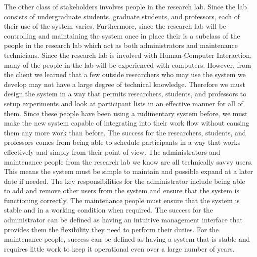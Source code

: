 The other class of stakeholders involves people in the research lab. Since the lab consists of undergraduate students, graduate students, and professors, each of their use of the system varies. Furthermore, since the research lab will be controlling and maintaining the system once in place their is a subclass of the people in the research lab which act as both administrators and maintenance technicians. Since the research lab is involved with Human-Computer Interaction, many of the people in the lab will be experienced with computers. However, from the client we learned that a few outside researchers who may use the system we develop may not have a large degree of technical knowledge. Therefore we must design the system in a way that permits researchers, students, and professors to setup experiments and look at participant lists in an effective manner for all of them. Since these people have been using a rudimentary system before, we must make the new system capable of integrating into their work flow without causing them any more work than before. The success for the researchers, students, and professors comes from being able to schedule participants in a way that works effectively and simply from their point of view. The administrators and maintenance people from the research lab we know are all technically savvy users. This means the system must be simple to maintain and possible expand at a later date if needed. The key responsibilities for the administrator include being able to add and remove other users from the system and ensure that the system is functioning correctly. The maintenance people must ensure that the system is stable and in a working condition when required. The success for the administrator can be defined as having an intuitive management interface that provides them the flexibility they need to perform their duties. For the maintenance people, success can be defined as having a system that is stable and requires little work to keep it operational even over a large number of years.

